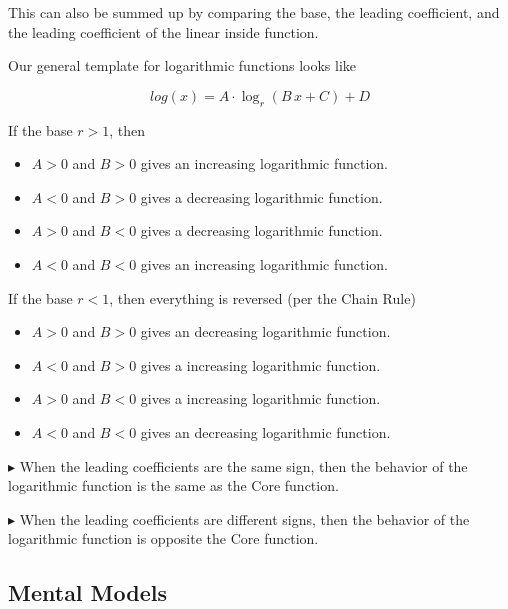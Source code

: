 \documentclass{ximera}
\begin{document}
This can also be summed up by comparing the base, the leading coefficient, and the leading coefficient of the linear inside function.



Our general template for logarithmic functions looks like

\[
log(x) = A \cdot \log_r(B \, x + C) + D
\]



If the base $r > 1$, then

\begin{itemize}
  \item $A > 0$ and $B > 0$ gives an increasing logarithmic function.
  \item $A < 0$ and $B > 0$ gives a decreasing logarithmic function.
  \item $A > 0$ and $B < 0$ gives a decreasing logarithmic function.
  \item $A < 0$ and $B < 0$ gives an increasing logarithmic function.
\end{itemize}





If the base $r < 1$, then everything is reversed (per the Chain Rule)

\begin{itemize}
  \item $A > 0$ and $B > 0$ gives an decreasing logarithmic function.
  \item $A < 0$ and $B > 0$ gives a increasing logarithmic function.
  \item $A > 0$ and $B < 0$ gives a increasing logarithmic function.
  \item $A < 0$ and $B < 0$ gives an decreasing logarithmic function.
\end{itemize}


$\blacktriangleright$ When the leading coefficients are the same sign, then the behavior of the logarithmic function is the same as the Core function. 

$\blacktriangleright$ When the leading coefficients are different signs, then the behavior of the logarithmic function is opposite the Core function.






\subsection*{Mental Models}
\end{document}
